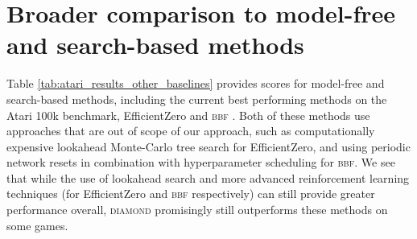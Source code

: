 \section{Broader comparison to model-free and search-based methods}
\label{app:additonal_baselines}

Table \ref{tab:atari_results_other_baselines} provides scores for model-free and search-based methods, including the current best performing methods on the Atari 100k benchmark, EfficientZero \citep{ye2021efficientzero} and \textsc{bbf} \citep{schwarzer2023bigger}. Both of these methods use approaches that are out of scope of our approach, such as computationally expensive lookahead Monte-Carlo tree search for EfficientZero, and using periodic network resets in combination with hyperparameter scheduling for \textsc{bbf}. We see that while the use of lookahead search and more advanced reinforcement learning techniques (for EfficientZero \citep{ye2021efficientzero} and \textsc{bbf} \citep{schwarzer2023bigger} respectively) can still provide greater performance overall, \textsc{diamond} promisingly still outperforms these methods on some games.


